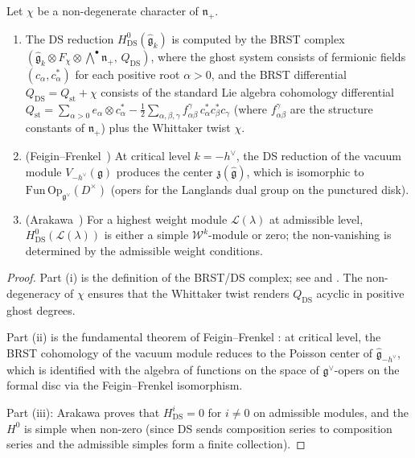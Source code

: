 \begin{proposition}
\label{prop:whittaker-ds}
Let $\chi$ be a non-degenerate character of $\mathfrak{n}_+$.
\begin{enumerate}[label=\textup{(\roman*)}]
\item The DS reduction
 $H^0_{\mathrm{DS}}(\widehat{\mathfrak{g}}_k)$ is computed by
 the BRST complex
 $(\widehat{\mathfrak{g}}_k \otimes F_\chi \otimes
 \bigwedge^\bullet \mathfrak{n}_+,\, Q_{\mathrm{DS}})$,
 where the ghost system consists of fermionic fields
 $(c_\alpha, c^*_\alpha)$ for each positive root $\alpha > 0$,
 and the BRST differential
 $Q_{\mathrm{DS}} = Q_{\mathrm{st}} + \chi$ consists of the
 standard Lie algebra cohomology differential
 $Q_{\mathrm{st}} = \sum_{\alpha > 0} e_\alpha \otimes
 c^*_\alpha - \frac{1}{2}\sum_{\alpha,\beta,\gamma}
 f^{\gamma}_{\alpha\beta}\, c^*_\alpha c^*_\beta c_\gamma$
 (where $f^{\gamma}_{\alpha\beta}$ are the structure constants
 of $\mathfrak{n}_+$) plus the Whittaker twist $\chi$.
\item \textup{(}Feigin--Frenkel~\cite{FF}\textup{)} At critical
 level $k = -h^\vee$, the DS reduction of the
 vacuum module $V_{-h^\vee}(\mathfrak{g})$ produces the center
 $\mathfrak{z}(\widehat{\mathfrak{g}})$, which is isomorphic
 to $\mathrm{Fun}\,\mathrm{Op}_{\mathfrak{g}^\vee}(D^\times)$
 \textup{(}opers for the Langlands dual group on the
 punctured disk\textup{)}.
\item \textup{(}Arakawa~\cite{Arakawa17}\textup{)} For a
 highest weight module $\mathcal{L}(\lambda)$ at admissible
 level, $H^0_{\mathrm{DS}}(\mathcal{L}(\lambda))$ is either
 a simple $\mathcal{W}^k$-module or zero; the non-vanishing
 is determined by the admissible weight conditions.
\end{enumerate}
\end{proposition}

\begin{proof}
Part (i) is the definition of the BRST/DS complex; see
\cite{FF} and \cite{KRW}. The non-degeneracy of $\chi$
ensures that the Whittaker twist renders $Q_{\mathrm{DS}}$
acyclic in positive ghost degrees.

Part (ii) is the fundamental theorem of Feigin--Frenkel
\cite{FF}: at critical level, the BRST cohomology of the
vacuum module reduces to the Poisson center of
$\widehat{\mathfrak{g}}_{-h^\vee}$, which is identified with
the algebra of functions on the space of $\mathfrak{g}^\vee$-opers
on the formal disc
via the Feigin--Frenkel isomorphism.

Part (iii): Arakawa proves that $H^i_{\mathrm{DS}} = 0$ for
$i \neq 0$ on admissible modules, and the $H^0$ is simple
when non-zero (since DS sends composition series to
composition series and the admissible simples form a finite
collection).
\end{proof}

